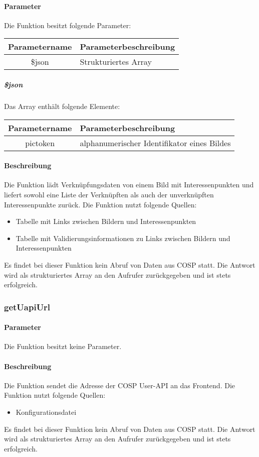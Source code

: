 \paragraph{Parameter} Die Funktion besitzt folgende Parameter:
\begin{table}[H]
	\begin{tabular}{|c|p{11cm}|}
		\hline
		\textbf{Parametername} & \textbf{Parameterbeschreibung} \\ \hline
		\$json & Strukturiertes Array \\ \hline
	\end{tabular}
\end{table}
\subparagraph{\$json}Das Array enthält folgende Elemente:
\begin{table}[H]
	\begin{tabular}{|c|p{11cm}|}
		\hline
		\textbf{Parametername} & \textbf{Parameterbeschreibung} \\ \hline
		pictoken  & alphanumerischer Identifikator eines Bildes \\ \hline
	\end{tabular}
\end{table}
\paragraph{Beschreibung} Die Funktion lädt Verknüpfungsdaten von einem Bild mit Interessenpunkten und liefert sowohl eine Liste der Verknüpften als auch der unverknüpften Interessenpunkte zurück. Die Funktion nutzt folgende Quellen:
\begin{itemize}
	\item Tabelle mit Links zwischen Bildern und Interessenpunkten
	\item Tabelle mit Validierungsinformationen zu Links zwischen Bildern und Interessenpunkten
\end{itemize}
Es findet bei dieser Funktion kein Abruf von Daten aus {\glqq COSP\grqq} statt. Die Antwort wird als strukturiertes Array an den Aufrufer zurückgegeben und ist stets erfolgreich.
\subsubsection{getUapiUrl}
\paragraph{Parameter} Die Funktion besitzt keine Parameter.
\paragraph{Beschreibung} Die Funktion sendet die Adresse der COSP User-API an das Frontend. Die Funktion nutzt folgende Quellen:
\begin{itemize}
	\item Konfigurationsdatei
\end{itemize}
Es findet bei dieser Funktion kein Abruf von Daten aus {\glqq COSP\grqq} statt. Die Antwort wird als strukturiertes Array an den Aufrufer zurückgegeben und ist stets erfolgreich.
